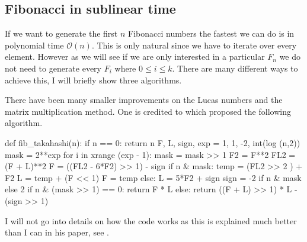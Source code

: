 \subsection{Fibonacci in sublinear time}

If we want to generate the first $n$ Fibonacci numbers the fastest we 
can do is in polynomial time $\mathcal{O}(n)$. This is only natural since we have to iterate over every element.
%
However as we will see if we are only interested in a particular $F_n$ we do not need to generate
every $F_i$ where $0 \leq i \leq k$. There are many different ways to achieve this, I will briefly show three algorithms.

There have been many smaller improvements on the Lucas numbers and the matrix multiplication method. 
One is credited to \citeauthor{Takahashi} which proposed the following algorithm. 
%
\begin{pythoncode}
	def fib_takahashi(n):
	    if n == 0:
	        return n
	    F, L, sign, exp = 1, 1, -2, int(log (n,2))
	    mask = 2**exp
	    for i in xrange (exp - 1):
	        mask = mask >> 1
	        F2   = F**2
	        FL2  = (F + L)**2
	        F    = ((FL2 - 6*F2) >> 1) - sign
	        if n & mask:
	            temp = (FL2 >> 2 ) + F2
	            L     = temp + (F << 1)
	            F     = temp
	        else:
	            L    = 5*F2 + sign
	        sign = -2 if n & mask else 2
	    if n & (mask >> 1) == 0:
	        return F * L
	    else:
	        return ((F + L) >> 1) * L - (sign >> 1)
\end{pythoncode}
%
I will not go into details on how the code works as this is explained much better than I can in his paper, see \cite{Takahashi}.


